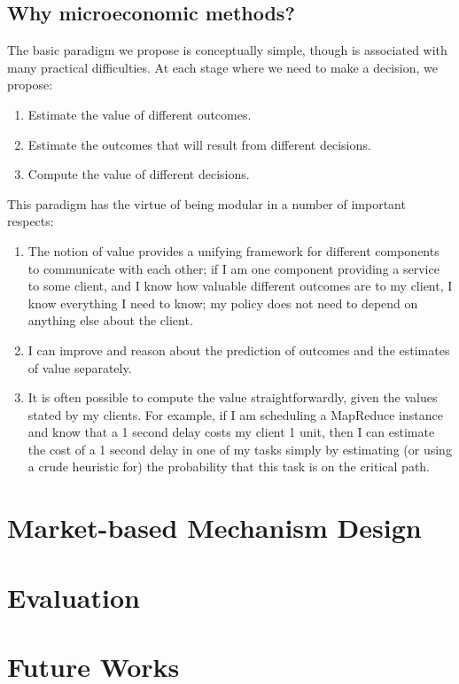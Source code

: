 \documentclass{acm_proc_article-sp}
\begin{document}
\subsection{Why microeconomic methods?}
The basic paradigm we propose is conceptually simple, though is associated with
many practical difficulties. At each stage where we need to make a decision, we
propose:
\begin{enumerate}
  \item Estimate the value of different outcomes.
  \item Estimate the outcomes that will result from different decisions.
  \item Compute the value of different decisions.
\end{enumerate}
    
This paradigm has the virtue of being modular in a number of important respects:
\begin{enumerate}
  \item The notion of value provides a unifying framework for different
    components to communicate with each other; if I am one component providing a
    service to some client, and I know how valuable different outcomes are to my
    client, I know everything I need to know; my policy does not need to depend
    on anything else about the client.
  \item I can improve and reason about the prediction of outcomes and the
    estimates of value separately. 
  \item It is often possible to compute the value straightforwardly, given the
    values stated  by my clients. For example, if I am scheduling a MapReduce
    instance and know that a 1 second delay costs my client 1 unit, then I can
    estimate the cost of a 1 second delay in one of my tasks simply by
    estimating (or using a crude heuristic for) the probability that this task
    is on the critical path.
\end{enumerate}

\section{Market-based Mechanism Design}
\label{sec:design}

\section{Evaluation}
\label{sec:eval}



\section{Future Works}
\label{sec:future}
\end{document}
